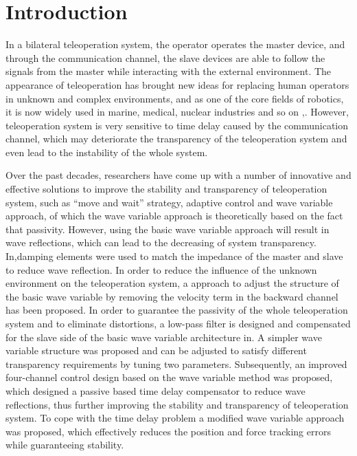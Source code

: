 \section{Introduction}
In a bilateral teleoperation system, 
the operator operates the master device, and through the communication channel, 
the slave devices are able to follow the signals from the master while interacting with the external environment.
The appearance of teleoperation has brought new ideas
for replacing human operators in unknown and complex environments,
and as one of the core fields of robotics,
it is now widely used in marine, medical,
nuclear industries and so on \cite{b1},\cite{b2}.
However,
teleoperation system is very sensitive to time delay caused by the communication channel,
which may deteriorate the transparency of the teleoperation system 
and even lead to the instability of the whole system\cite{b3}.
\par Over the past decades, 
researchers have come up with a number of innovative and effective solutions
to improve the stability and transparency of teleoperation system,
such as ``move and wait'' strategy\cite{b4}, adaptive control and
wave variable approach, of which the wave variable approach is theoretically based on the fact that passivity\cite{b5}.
However, using the basic wave variable approach will result in wave reflections,
which can lead to the decreasing  of system transparency.
In\cite{b6},damping elements were used to match the impedance of 
the master and slave to reduce wave reflection.
In order to reduce the influence of the unknown environment 
on the teleoperation system, 
a approach to adjust the structure of the basic wave variable 
by removing the velocity term in the backward channel has been proposed\cite{b7}.
In order to guarantee the passivity of the whole teleoperation system 
and to eliminate distortions, a low-pass filter is designed 
and compensated for the slave side of the basic wave variable architecture in\cite{b8}.
A simpler wave variable structure was proposed and can
be adjusted to satisfy different transparency requirements by tuning two parameters\cite{b9}.
Subsequently, an improved four-channel control design based on the wave variable method 
was proposed, which designed a passive based time delay compensator to reduce wave reflections, 
thus further improving the stability and transparency of teleoperation system\cite{b10}.
To cope with the time delay problem a modified wave variable approach was proposed,
which effectively reduces the position and force tracking errors while guaranteeing stability\cite{b11}.
